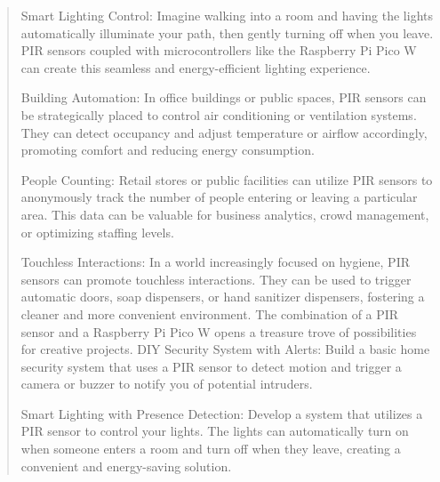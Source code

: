 \documentclass[12pt]{report}
\begin{document}
\begin{quote}
				Smart Lighting Control: Imagine walking into a room and having the lights automatically illuminate your path, then gently turning off when you leave. PIR sensors coupled with microcontrollers like the Raspberry Pi Pico W can create this seamless and energy-efficient lighting experience.
				
				Building Automation: In office buildings or public spaces, PIR sensors can be strategically placed to control air conditioning or ventilation systems. They can detect occupancy and adjust temperature or airflow accordingly, promoting comfort and reducing energy consumption.
				
				People Counting: Retail stores or public facilities can utilize PIR sensors to anonymously track the number of people entering or leaving a particular area. This data can be valuable for business analytics, crowd management, or optimizing staffing levels.
				
				Touchless Interactions: In a world increasingly focused on hygiene, PIR sensors can promote touchless interactions. They can be used to trigger automatic doors, soap dispensers, or hand sanitizer dispensers, fostering a cleaner and more convenient environment.
				The combination of a PIR sensor and a Raspberry Pi Pico W opens a treasure trove of possibilities for creative projects.
				DIY Security System with Alerts: Build a basic home security system that uses a PIR sensor to detect motion and trigger a camera or buzzer to notify you of potential intruders.
				
				Smart Lighting with Presence Detection: Develop a system that utilizes a PIR sensor to control your lights. The lights can automatically turn on when someone enters a room and turn off when they leave, creating a convenient and energy-saving solution.
				\end{quote}
				\clearpage
				
\end{document}
